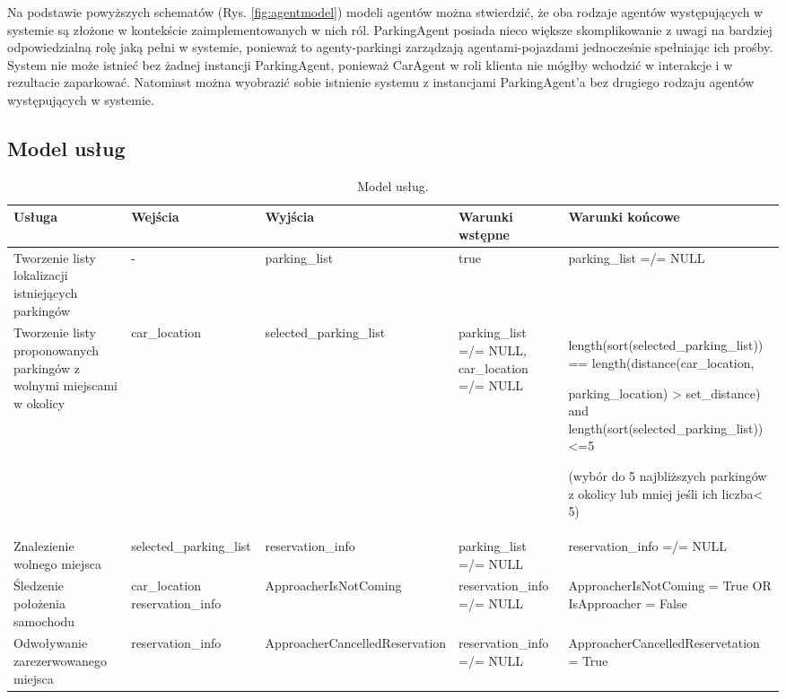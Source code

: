     Na podstawie powyższych schematów (Rys. \ref{fig:agentmodel}) modeli agentów można stwierdzić, że oba rodzaje agentów  występujących w systemie są złożone w kontekście zaimplementowanych w nich ról. ParkingAgent posiada nieco większe skomplikowanie z uwagi na bardziej odpowiedzialną rolę jaką pełni w systemie, ponieważ to agenty-parkingi zarządzają agentami-pojazdami jednocześnie spełniając ich prośby. System nie może istnieć bez żadnej instancji ParkingAgent, ponieważ CarAgent w roli klienta nie mógłby wchodzić w interakcje i w rezultacie zaparkować. Natomiast można wyobrazić sobie istnienie systemu z instancjami ParkingAgent’a bez drugiego rodzaju agentów występujących w systemie.

\newpage
\subsection{Model usług}


\begin{table}[!h] \label{tab:modeluslug} \centering
    \caption{Model usług.}
    \begin{tabular} {| m{2cm} | m{2cm} | m{3cm} | m{3cm} | m{4cm} |} \hline
        Usługa   & Wejścia & Wyjścia & Warunki wstępne & Warunki końcowe \\ \hline
        Tworzenie listy lokalizacji istniejących parkingów & - & parking\_list & true & parking\_list =/= NULL \\ \hline
        Tworzenie listy proponowanych parkingów z wolnymi miejscami w okolicy & car\_location & selected\_\-parking\_list & parking\_list =/= NULL, car\_location =/= NULL & length(sort(selected\_\-parking\_list)) == length(distance(car\_\-location, 
        
        parking\_location) > set\_distance) and length(sort(selected\_\-parking\_list)) <=5

        (wybór  do 5 najbliższych parkingów  z okolicy lub mniej  jeśli ich liczba< 5)
         \\ \hline
        Znalezienie wolnego miejsca & selected\_\-parking\_list & reservation\_info & parking\_list =/= NULL & reservation\_info =/= NULL \\ \hline
        Śledzenie położenia samochodu & car\_location reservation\_info & ApproacherIsNot\-Coming & reservation\_info =/= NULL & ApproacherIsNot\-Coming = True OR IsApproacher = False \\ \hline
        Odwoły\-wanie zarezerwowanego miejsca & reserva\-tion\_info & Approacher\-Cancelled\-Reservation & reservation\_info =/= NULL & ApproacherCancelled\-Reservetation = True \\ \hline
    \end{tabular}
\end{table}

